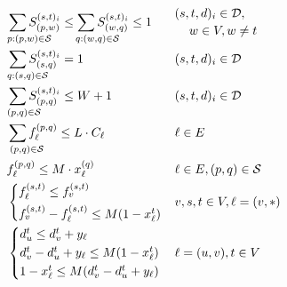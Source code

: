 \documentclass[a4paper,USenglish]{lipics-v2018}
\begin{document}
\begin{align}
&\sum_{\hspace{-4ex}\mathrlap{ p:(p,w) \in \mathcal{S}}} 	S^{(s,t)_i}_{(p,w)}	
	\leq \sum_{\hspace{-4ex}\mathrlap{ q:(w,q) \in \mathcal{S}}}
S^{(s,t)_i}_{(w,q) }	\leq 1
&&	 
\begin{multlined}
	(s,t,d)_i \in \mathcal{D}, \\
	w \in V, w \neq t
\end{multlined} \label{LP:segmentDegree}
\\
&\sum_{\hspace{-4ex}\mathrlap{ q:(s,q) \in \mathcal{S}}} S^{(s,t)_i}_{(s,q)} = 1
&&  (s,t,d)_i \in \mathcal{D}
\label{LP:wp_limit} 
\\
&\sum_{\hspace{-4ex}\mathrlap{(p,q) \in \mathcal{S}}} S^{(s,t)_i}_{(p,q)}  \leq W+1
&&  (s,t,d)_i \in \mathcal{D}
\label{LP:wp_limit} 
\\
& \sum_{\hspace{-3ex}\mathrlap{(p,q) \in \mathcal{S}}} f^{(p,q)}_{\ell} \leq L \cdot C_{\ell}
&&  \ell \in E
\\
&   f^{(p,q)}_{\ell} \leq M \cdot x^{(q)}_{\ell}
&&  \ell \in E, (p,q) \in \mathcal{S}
\label{LP:SPTree} 
\\
&
\begin{cases*}
f^{(s,t)}_{\ell} \leq f^{(s,t)}_{v}	\\
f^{(s,t)}_{v} - f^{(s,t)}_{\ell} \leq M(1 - x^{t}_{\ell}) 
\end{cases*}	
&&  v,s,t \in V, \ell = (v,*)
\label{LP:equalSplit} 
\\ 
&\begin{cases*}
d^{t}_u \leq d^{t}_v + y_{\ell} \\
d^{t}_v - d^{t}_u + y_{\ell} \leq M(1 - x^t_{\ell})	\\
1 - x^t_{\ell} \leq M(d^{t}_v - d^{t}_u + y_{\ell})
\end{cases*}
&&  \ell = (u,v),  t \in V
\label{LP:weights}
\end{align}
\end{document}
